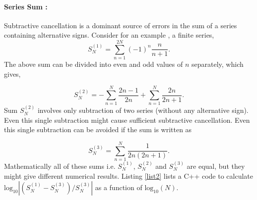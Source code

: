 \documentclass[a4,12pt]{article}
\numberwithin{equation}{subsection}
\begin{document}
\paragraph{Series Sum : } Subtractive cancellation is a dominant source of errors in the sum of a series containing alternative signs. Consider for an example , a finite series,
\begin{equation}
S^{(1)}_N = \sum_{n=1}^{2N} (-1)^n \frac{n}{n+1}.
\end{equation}
The above sum can be divided into even and odd values of $n$ separately, which gives,

\begin{equation}
S^{(2)}_N = - \sum_{n=1}^{N} \frac{2n-1}{2n} + \sum_{n=1}^{N}\frac{2n}{2n+1}.
\end{equation}
Sum $S^{(2)}_N$ involves only subtraction of two series (without any alternative sign). Even this single subtraction might cause sufficient subtractive cancellation. Even this single subtraction can be avoided if the sum is written as 

\begin{equation}
S^{(3)}_N = \sum_{n=1}^{N} \frac{1}{2n(2n+1)}.
\end{equation}
Mathematically all of these sums i.e. $S^{(1)}_N$, $S^{(2)}_N$ and $S^{(3)}_N$ are equal, but they might give different numerical results. Listing \ref{list2} lists a C++ code to calculate $\text{log}_{10}|(S^{(1)}_N-S^{(3)}_N)/S^{(3)}_N|$ as a function of $\text{log}_{10}(N)$.
\end{document}
